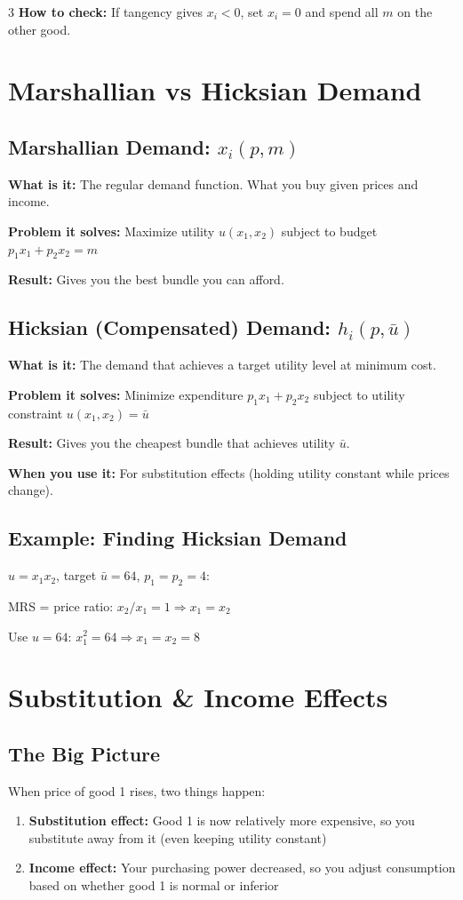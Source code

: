 \documentclass[10pt,landscape]{article}
\begin{document}
\begin{multicols}{3}
\textbf{How to check:} If tangency gives $x_i < 0$, set $x_i = 0$ and spend all $m$ on the other good.

\section{Marshallian vs Hicksian Demand}

\subsection{Marshallian Demand: $x_i(p, m)$}
\textbf{What is it:} The regular demand function. What you buy given prices and income.

\textbf{Problem it solves:} Maximize utility $u(x_1, x_2)$ subject to budget $p_1x_1 + p_2x_2 = m$

\textbf{Result:} Gives you the best bundle you can afford.

\subsection{Hicksian (Compensated) Demand: $h_i(p, \bar{u})$}
\textbf{What is it:} The demand that achieves a target utility level at minimum cost.

\textbf{Problem it solves:} Minimize expenditure $p_1x_1 + p_2x_2$ subject to utility constraint $u(x_1, x_2) = \bar{u}$

\textbf{Result:} Gives you the cheapest bundle that achieves utility $\bar{u}$.

\textbf{When you use it:} For substitution effects (holding utility constant while prices change).

\subsection{Example: Finding Hicksian Demand}
$u = x_1 x_2$, target $\bar{u} = 64$, $p_1 = p_2 = 4$:

MRS = price ratio: $x_2/x_1 = 1 \Rightarrow x_1 = x_2$

Use $u = 64$: $x_1^2 = 64 \Rightarrow x_1 = x_2 = 8$

\section{Substitution \& Income Effects}

\subsection{The Big Picture}
When price of good 1 rises, two things happen:
\begin{enumerate}[leftmargin=*,noitemsep,topsep=0pt]
\item \textbf{Substitution effect:} Good 1 is now relatively more expensive, so you substitute away from it (even keeping utility constant)
\item \textbf{Income effect:} Your purchasing power decreased, so you adjust consumption based on whether good 1 is normal or inferior
\end{enumerate}


\end{multicols}
\end{document}
